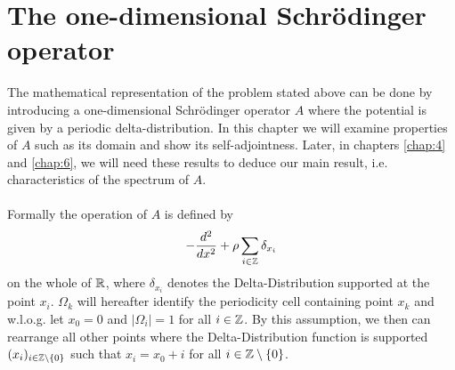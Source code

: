 \chapter{The one-dimensional Schrödinger operator} \label{chap:3}

The mathematical representation of the problem stated above can be done by introducing a one-dimensional Schrödinger operator $A$ where the potential is given by a periodic delta-distribution. In this chapter we will examine properties of $A$ such as its domain and show its self-adjointness. Later, in chapters \ref{chap:4} and \ref{chap:6}, we will need these results to deduce our main result, i.e. characteristics of the spectrum of $A$. ~\\ ~\\
Formally the operation of $A$ is defined by
\begin{equation}
	- \frac{d^{2}}{dx^{2}} + \rho \sum_{i \in \mathbb{Z}} \delta_{x_{i}} \label{the-operator-A-formally}
\end{equation}
on the whole of $\mathbb{R}$, where $\delta_{x_{i}}$ denotes the Delta-Distribution supported at the point $x_{i}$. $\Omega_{k}$ will hereafter identify the periodicity cell containing point $x_{k}$ and w.l.o.g. let $x_{0} = 0$ and $|\Omega_{i}| = 1$ for all $i \in \mathbb{Z}$. By this assumption, we then can rearrange all other points where the Delta-Distribution function is supported $(x_{i})_{i \in \mathbb{Z} \setminus \{0\}}$ such that $x_{i} = x_{0} + i$ for all $i \in \mathbb{Z} \setminus \{0\}$. 
~\\  

